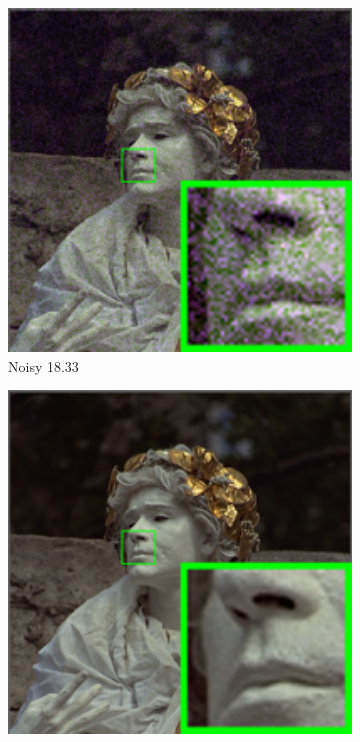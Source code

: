\begin{figure}
    \centering
    \begin{subfigure}[t]{0.19\textwidth}
        \centering
        \includegraphics[width=1\textwidth]{images/mcwnnm/24images/resize_br_Noisy_nSig301050_kodim17.png}
		\caption{Noisy 18.33}
    \end{subfigure}
    \hfill
    \begin{subfigure}[t]{0.19\textwidth}
        \centering
        \includegraphics[width=1\textwidth]{images/mcwnnm/24images/resize_br_kodim17.png}

\end{subfigure}
\end{figure}
